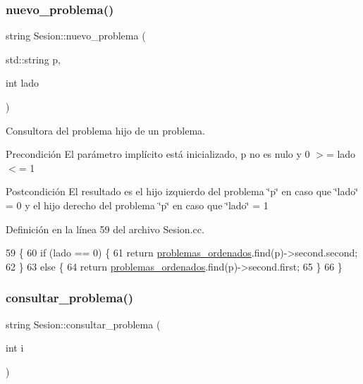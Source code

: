 \subsubsection{\texorpdfstring{nuevo\+\_\+problema()}{nuevo\_problema()}}
{\footnotesize\ttfamily string Sesion\+::nuevo\+\_\+problema (\begin{DoxyParamCaption}\item[{std\+::string}]{p,  }\item[{int}]{lado }\end{DoxyParamCaption})}



Consultora del problema hijo de un problema. 

\begin{DoxyPrecond}{Precondición}
El parámetro implícito está inicializado, p no es nulo y 0 $>$= lado $<$= 1 
\end{DoxyPrecond}
\begin{DoxyPostcond}{Postcondición}
El resultado es el hijo izquierdo del problema \char`\"{}p\char`\"{} en caso que \char`\"{}lado\char`\"{} = 0 y el hijo derecho del problema \char`\"{}p\char`\"{} en caso que \char`\"{}lado\char`\"{} = 1 
\end{DoxyPostcond}


Definición en la línea 59 del archivo Sesion.\+cc.


\begin{DoxyCode}
59                                                 \{
60   \textcolor{keywordflow}{if} (lado == 0) \{
61     \textcolor{keywordflow}{return} \mbox{\hyperlink{class_sesion_a4f770d029f7be9368a3abec6af7e8de7}{problemas\_ordenados}}.find(p)->second.second;
62   \}
63   \textcolor{keywordflow}{else} \{
64     \textcolor{keywordflow}{return} \mbox{\hyperlink{class_sesion_a4f770d029f7be9368a3abec6af7e8de7}{problemas\_ordenados}}.find(p)->second.first;
65   \}
66 \}
\end{DoxyCode}
\mbox{\label{class_sesion_a035f4d3118ed20daedf95307128a1fbb}} 
\subsubsection{\texorpdfstring{consultar\+\_\+problema()}{consultar\_problema()}}
{\footnotesize\ttfamily string Sesion\+::consultar\+\_\+problema (\begin{DoxyParamCaption}\item[{int}]{i }\end{DoxyParamCaption})}



